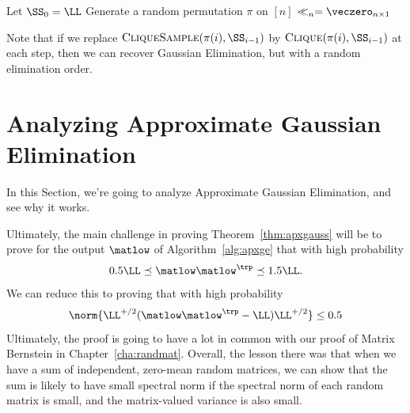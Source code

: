 \begin{algorithm}[H]
\label{alg:apxge}
\caption{Approximate Gaussian Elimination / Cholesky Decomposition}
Let $\SS_0 = \LL$\;
Generate a random permutation $\pi$ on $[n]$\;
$\ll_n = \veczero_{n \times 1}$\;
\Return{$\matlow=\begin{bmatrix} \ll_1 \cdots \ll_n \end{bmatrix}$ and
$\pi$}\;
\end{algorithm}
Note that if we replace
$\vcliqsp{\pi(i)}{\SS_{i-1}}$ by $\vcliq{\pi(i)}{\SS_{i-1}}$ at each
step, then we can recover Gaussian Elimination, but with a random
elimination order.

\section{Analyzing Approximate Gaussian Elimination}

In this Section, we're going to analyze Approximate Gaussian
Elimination, and see why it works.

Ultimately, the main challenge in proving Theorem~\ref{thm:apxgauss}
will be to prove for the output $\matlow$
of Algorithm~\ref{alg:apxge} that with high probability
\begin{equation}
  \label{eq:relerrgoal}
0.5 \LL
\preceq
\matlow \matlow^{\trp}
\preceq 1.5 \LL
.
\end{equation}
We can reduce this to proving that with high probability
\begin{equation}
\label{eq:spectralnormgoal}
 \norm{\LL^{+/2} (\matlow \matlow^{\trp} -  \LL) \LL^{+/2}} \leq 0.5
\end{equation}
Ultimately, the proof is going to have a lot in common with our proof
of Matrix Bernstein in Chapter~\ref{cha:randmat}.
Overall, the lesson there was that when we have a sum of independent,
zero-mean random matrices, we can show that the sum is likely to have
small spectral norm if the spectral norm of each random matrix is
small, and the matrix-valued variance is also small.

